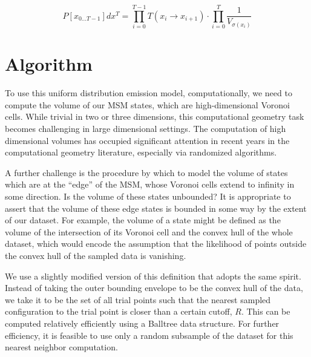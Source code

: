 \documentclass[twocolumn,floatfix,nofootinbib,aps]{revtex4-1}
\begin{document}

\begin{equation}
\label{eq:like_vol}
P[x_{0...T-1}] dx^T = \prod_{i=0}^{T-1} T(x_i \rightarrow x_{i+1}) \cdot \prod_{i=0}^T \frac{1}{V_{\sigma(x_{i})}}
\end{equation}

\section{Algorithm}

To use this uniform distribution emission model, computationally, we
need to compute the volume of our MSM states, which are high-dimensional
Voronoi cells. While trivial in two or three dimensions, this
computational geometry task becomes challenging in large dimensional
settings. The computation of high dimensional volumes has occupied significant
attention in recent years in the computational geometry literature, especially
via randomized algorithms.\cite{Simonovits03, Lovasz03}

A further challenge is the procedure by which to model the volume of states which are at the ``edge'' of the MSM, whose Voronoi cells extend to infinity in some direction. Is the volume of these states unbounded? It is appropriate to assert that the volume of these edge states is bounded in some way by the extent of our dataset. For example, the volume of a state might be defined as the volume of the intersection of its Voronoi cell and the convex hull of the whole dataset, which would encode the assumption that the likelihood of points
outside the convex hull of the sampled data is vanishing.

We use a slightly modified version of this definition that adopts
the same spirit. Instead of taking the outer bounding envelope to be the convex hull of the data, we take it to be the set of all trial points such that the nearest sampled configuration to the trial point is closer than a certain cutoff, $R$. This can be computed relatively efficiently using a Balltree data structure.\cite{Omohundro1989} For further efficiency, it is feasible to use only a random subsample of the dataset for this nearest neighbor computation.
\end{document}
